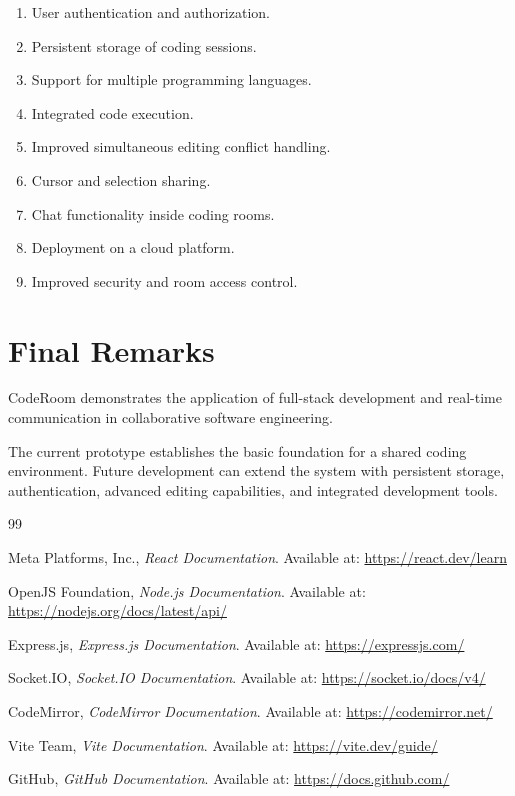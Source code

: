 \documentclass[12pt,a4paper,oneside]{report}
\begin{document}
\begin{enumerate}
    \item User authentication and authorization.
    \item Persistent storage of coding sessions.
    \item Support for multiple programming languages.
    \item Integrated code execution.
    \item Improved simultaneous editing conflict handling.
    \item Cursor and selection sharing.
    \item Chat functionality inside coding rooms.
    \item Deployment on a cloud platform.
    \item Improved security and room access control.
\end{enumerate}

\section{Final Remarks}

CodeRoom demonstrates the application of full-stack development and real-time communication in collaborative software engineering.

The current prototype establishes the basic foundation for a shared coding environment. Future development can extend the system with persistent storage, authentication, advanced editing capabilities, and integrated development tools.

\begin{thebibliography}{99}

Meta Platforms, Inc.,
\textit{React Documentation}.
Available at:
\url{https://react.dev/learn}

OpenJS Foundation,
\textit{Node.js Documentation}.
Available at:
\url{https://nodejs.org/docs/latest/api/}

Express.js,
\textit{Express.js Documentation}.
Available at:
\url{https://expressjs.com/}

Socket.IO,
\textit{Socket.IO Documentation}.
Available at:
\url{https://socket.io/docs/v4/}

CodeMirror,
\textit{CodeMirror Documentation}.
Available at:
\url{https://codemirror.net/}

Vite Team,
\textit{Vite Documentation}.
Available at:
\url{https://vite.dev/guide/}

GitHub,
\textit{GitHub Documentation}.
Available at:
\url{https://docs.github.com/}

\end{thebibliography}
\end{document}
